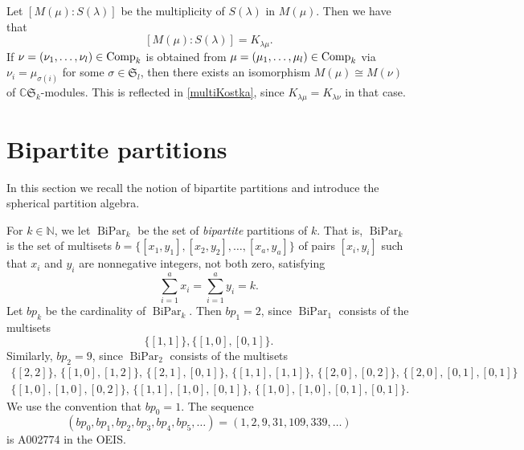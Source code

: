 \documentclass[10pt,hidelinks]{article}
\newcommand{\N}{ { \mathbb N}}
\newcommand{\Comp}{{\rm Comp}   }
\newcommand{\CC}{ \mathbb C }
\newcommand{\Si}{\mathfrak{S}}
\newcommand{\BiPar}{ \operatorname{BiPar}}
\numberwithin{equation}{section}
\begin{document}
\medskip
Let $  [M(\mu): S(\lambda) ]   $ be the multiplicity of $ S(\lambda ) $ in $ M(\mu) $.
Then we have that 
\begin{equation}\label{multiKostka}
 [M(\mu): S(\lambda) ] = K_{\lambda \mu}. 
\end{equation}
If $ \nu = (\nu_1, \ldots, \nu_l) \in \Comp_k $ is obtained from $ \mu = 
(\mu_1, \ldots, \mu_l) \in \Comp_k $ via $ \nu_i = \mu_{ \sigma(i) } $ for some
$ \sigma \in \Si_l $, then there exists an
isomorphism $  M(\mu) \cong M(\nu) $ of $ \CC \Si_k $-modules. This is reflected in 
\eqref{multiKostka}, since $ K_{\lambda \mu}  = K_{\lambda \nu}  $ in that case. 


\section{Bipartite partitions}\label{Bipartite partitions}
In this section we recall the notion of
bipartite partitions and introduce the spherical partition algebra. 

\medskip
  
For $ k \in \N$, we let $ \BiPar_k $ be the set of {\it bipartite} partitions of $ k  $. That is, 
$ \BiPar_k $ is 
the set of multisets
$ b= \{ [x_1, y_1],  [x_2, y_2], \ldots,  [x_a, y_a]   \} $
of pairs $ [x_i, y_i] $ such that 
$ x_i $ and $ y_i $ are nonnegative integers, not both zero, 
satisfying 
\begin{equation}
\sum_{i =1}^a x_i = \sum_{i =1 }^a  y_i= k. 
\end{equation}
Let $ bp_k $ be the cardinality of $  \BiPar_k $. Then $bp_1= 2 $, since 
$ \BiPar_1 $ consists of the multisets
\begin{equation}
 \{ [1, 1] \},  \{ [1, 0], [0,1] \}.
\end{equation}
Similarly,
$bp_2= 9 $, since 
$ \BiPar_2 $ consists of the multisets
\begin{equation}
  \begin{array}{l}
    \{ [2,2] \}, \,  \{ [1, 0], [1,2] \}, \,  \{ [2, 1], [0,1] \},\,  \{ [1, 1], [1,1]\},\,  \{ [2, 0], [0,2] \},\, 
 \{ [2, 0], [0,1], [0,1] \}
    \\
 \{ [1, 0], [1,0], [0,2] \}, \,  \{ [1, 1], [1,0], [0,1] \}, \, \{ [1, 0], [1,0], [0,1], [0,1] \}. 
  \end{array}
\end{equation}
We use the convention that $bp_0= 1 $. The sequence
\begin{equation} ( bp_0, bp_1, bp_2, bp_3,  bp_4, bp_5, \ldots )
= (1, 2, 9, 31, 109, 339, \ldots )
\end{equation}
is A002774 in the OEIS.
\end{document}
